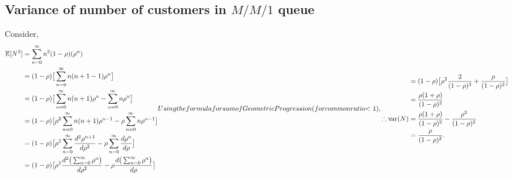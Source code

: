 \documentclass[11pt, a4paper]{report}
\begin{document}
\subsection{Variance of number of customers in $M/M/1$ queue}
Consider,
\begin{subequations}
    \begin{align}
        \ExpVal[N^2] &= \sum_{n=0}^{\infty} n^2 (1 - \rho)(\rho^n) \\
        &= (1 - \rho) \big[\sum_{n=0}^{\infty}n(n+1-1)\rho^n \big] \\
        &= (1 - \rho) \big[\sum_{n=0}^{\infty} n(n+1)\rho^n - \sum_{n=0}^{\infty}n\rho^n\big] \\
        &= (1 - \rho) \big[\rho^2 \sum_{n=0}^{\infty} n(n+1)\rho^{n-1} - \rho\sum_{n=0}^{\infty}n\rho^{n-1}\big] \\
        &= (1 - \rho) \big[\rho^2 \sum_{n=0}^{\infty} \frac{d^2\rho^{n+1}}{d\rho^2} - \rho\sum_{n=0}^{\infty}\frac{d\rho^{n}}{d \rho}\big] \\
        &= (1 - \rho) \big[\rho^2 \frac{d^2 \big(\sum_{n=0}^{\infty} \rho^n \big)}{d\rho^2} - \rho \frac{d \big(\sum_{n=0}^{\infty} \rho^n \big)}{d\rho}\big]
    \end{align}
    Using the formula for sum of Geometric Progression (for common ratio $< 1$),
    \begin{align}
        &= (1 - \rho) \big[ \rho^2 \frac{2}{(1-\rho)^3} + \frac{\rho}{(1 - \rho)^ 2}\big] \\
        &= \frac{\rho(1 + \rho)}{(1 - \rho)^ 2} \\
        \therefore \text{var}(N) &= \frac{\rho(1 + \rho)}{(1 - \rho)^ 2} - \frac{\rho^2}{(1 - \rho)^2} \\
        &= \frac{\rho}{(1 - \rho)^2}.
    \end{align} 
    \label{fig:varMM1}
\end{subequations}
\end{document}
